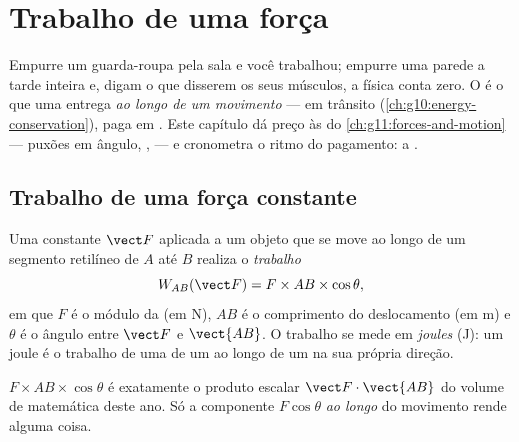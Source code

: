 \chapter{Trabalho de uma força}\label{ch:g11:work-of-force}

Empurre um guarda-roupa pela sala e você trabalhou; empurre uma parede a
tarde inteira e, digam o que disserem os seus músculos, a física conta
zero. O  é o que uma  entrega \emph{ao longo de um
movimento} ---  em trânsito
(\cref{ch:g10:energy-conservation}), paga em . Este capítulo dá
preço às  do \cref{ch:g11:forces-and-motion} --- puxões em ângulo,
,  --- e cronometra o ritmo do pagamento: a .

\section{Trabalho de uma força constante}

\begin{definition}\label{def:g11:work-of-force:work}
Uma  constante $\vect F$ aplicada a um objeto que se move ao longo
de um segmento retilíneo de $A$ até $B$ realiza o
\emph{trabalho}
\[
W_{AB}(\vect F) = F \times AB \times \cos\theta ,
\]
em que $F$ é o módulo da  (em \unit{N}), $AB$ é o comprimento do
deslocamento (em \unit{m}) e $\theta$ é o ângulo entre $\vect F$ e
$\vect{AB}$. O trabalho se mede em \emph{joules}
(\unit{J}): um joule é o trabalho de uma  de um  ao longo de
um  na sua própria direção.
\end{definition}

\begin{remark}\label{rem:g11:work-of-force:scal}
$F \times AB \times \cos\theta$ é exatamente o produto escalar
$\vect F \cdot \vect{AB}$ do volume de matemática deste ano. Só a
componente $F\cos\theta$ \emph{ao longo} do movimento rende alguma coisa.
\end{remark}

